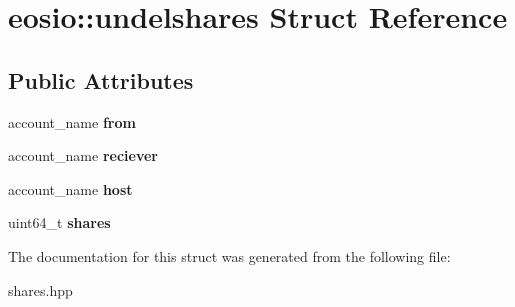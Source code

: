 \hypertarget{structeosio_1_1undelshares}{}\section{eosio\+:\+:undelshares Struct Reference}
\label{structeosio_1_1undelshares}
\subsection*{Public Attributes}
\begin{DoxyCompactItemize}
\item 
\mbox{\label{structeosio_1_1undelshares_ace166bd54b1b4193d449b6d0004fd8d5}} 
account\+\_\+name {\bfseries from}
\item 
\mbox{\label{structeosio_1_1undelshares_ab59b50fe824d47e0e8ca1d0dcda1b977}} 
account\+\_\+name {\bfseries reciever}
\item 
\mbox{\label{structeosio_1_1undelshares_a24dc07b9c9d728a959db8b3d904a5e7e}} 
account\+\_\+name {\bfseries host}
\item 
\mbox{\label{structeosio_1_1undelshares_a5c139b4398ce7ec6b32f1dff13563082}} 
uint64\+\_\+t {\bfseries shares}
\end{DoxyCompactItemize}


The documentation for this struct was generated from the following file\+:\begin{DoxyCompactItemize}
\item 
shares.\+hpp\end{DoxyCompactItemize}
